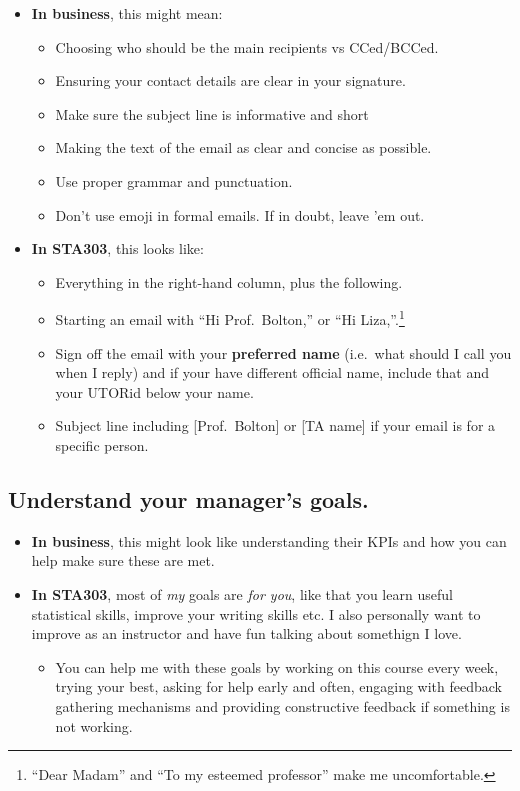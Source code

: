 \documentclass[
]{book}
\providecommand{\tightlist}{%
  \setlength{\itemsep}{0pt}\setlength{\parskip}{0pt}}
\begin{document}
\begin{itemize}
\tightlist
\item
  \textbf{In business}, this might mean:

  \begin{itemize}
  \tightlist
  \item
    Choosing who should be the main recipients vs CCed/BCCed.
  \item
    Ensuring your contact details are clear in your signature.
  \item
    Make sure the subject line is informative and short
  \item
    Making the text of the email as clear and concise as possible.
  \item
    Use proper grammar and punctuation.
  \item
    Don't use emoji in formal emails. If in doubt, leave 'em out.
  \end{itemize}
\item
  \textbf{In STA303}, this looks like:

  \begin{itemize}
  \tightlist
  \item
    Everything in the right-hand column, plus the following.
  \item
    Starting an email with ``Hi Prof.~Bolton,'' or ``Hi Liza,''.\footnote{``Dear Madam'' and ``To my esteemed professor'' make me uncomfortable.}
  \item
    Sign off the email with your \textbf{preferred name} (i.e.~what should I call you when I reply) and if your have different official name, include that and your UTORid below your name.
  \item
    Subject line including {[}Prof.~Bolton{]} or {[}TA name{]} if your email is for a specific person.
  \end{itemize}
\end{itemize}

\hypertarget{understand-your-managers-goals.}{%
\subsection{Understand your manager's goals.}\label{understand-your-managers-goals.}}

\begin{itemize}
\tightlist
\item
  \textbf{In business}, this might look like understanding their KPIs and how you can help make sure these are met.
\item
  \textbf{In STA303}, most of \emph{my} goals are \emph{for you}, like that you learn useful statistical skills, improve your writing skills etc. I also personally want to improve as an instructor and have fun talking about somethign I love.

  \begin{itemize}
  \tightlist
  \item
    You can help me with these goals by working on this course every week, trying your best, asking for help early and often, engaging with feedback gathering mechanisms and providing constructive feedback if something is not working.
  \end{itemize}
\end{itemize}
\end{document}
